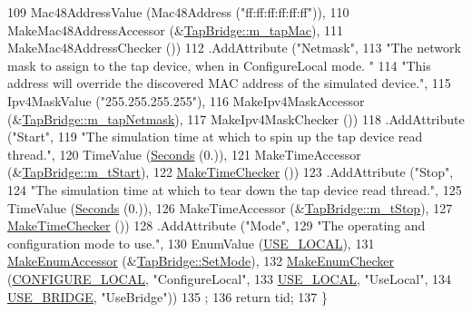 \begin{DoxyCode}
109                    Mac48AddressValue (Mac48Address (\textcolor{stringliteral}{"ff:ff:ff:ff:ff:ff"})),
110                    MakeMac48AddressAccessor (&\hyperlink{classns3_1_1TapBridge_afdaa87d8c5a5e249ee8d94f75183e91f}{TapBridge::m\_tapMac}),
111                    MakeMac48AddressChecker ())
112     .AddAttribute (\textcolor{stringliteral}{"Netmask"}, 
113                    \textcolor{stringliteral}{"The network mask to assign to the tap device, when in ConfigureLocal mode.  "}
114                    \textcolor{stringliteral}{"This address will override the discovered MAC address of the simulated device."},
115                    Ipv4MaskValue (\textcolor{stringliteral}{"255.255.255.255"}),
116                    MakeIpv4MaskAccessor (&\hyperlink{classns3_1_1TapBridge_a9374f832e2a96385651d27a5fbc7ba57}{TapBridge::m\_tapNetmask}),
117                    MakeIpv4MaskChecker ())
118     .AddAttribute (\textcolor{stringliteral}{"Start"}, 
119                    \textcolor{stringliteral}{"The simulation time at which to spin up the tap device read thread."},
120                    TimeValue (\hyperlink{group__timecivil_ga33c34b816f8ff6628e33d5c8e9713b9e}{Seconds} (0.)),
121                    MakeTimeAccessor (&\hyperlink{classns3_1_1TapBridge_ad6cde3114d24223d3edf0270ce4af231}{TapBridge::m\_tStart}),
122                    \hyperlink{group__time_ga7032965bd4afa578691d88c09e4481c1}{MakeTimeChecker} ())
123     .AddAttribute (\textcolor{stringliteral}{"Stop"}, 
124                    \textcolor{stringliteral}{"The simulation time at which to tear down the tap device read thread."},
125                    TimeValue (\hyperlink{group__timecivil_ga33c34b816f8ff6628e33d5c8e9713b9e}{Seconds} (0.)),
126                    MakeTimeAccessor (&\hyperlink{classns3_1_1TapBridge_ae91102625b83c3b447f48d1798041ab8}{TapBridge::m\_tStop}),
127                    \hyperlink{group__time_ga7032965bd4afa578691d88c09e4481c1}{MakeTimeChecker} ())
128     .AddAttribute (\textcolor{stringliteral}{"Mode"}, 
129                    \textcolor{stringliteral}{"The operating and configuration mode to use."},
130                    EnumValue (\hyperlink{classns3_1_1TapBridge_acac8d3ebe259ddfa9cd369515f04618daa73ff9ba9e1659aeda35d7181b601c75}{USE\_LOCAL}),
131                    \hyperlink{namespacens3_af5050739867ce63896dec011e332c8ec}{MakeEnumAccessor} (&\hyperlink{classns3_1_1TapBridge_a435d654af7e7970c365d14b4a5dc3044}{TapBridge::SetMode}),
132                    \hyperlink{namespacens3_a48832781a2b521d3d0091e05ece30615}{MakeEnumChecker} (\hyperlink{classns3_1_1TapBridge_acac8d3ebe259ddfa9cd369515f04618daf2d0f6c8152d38e9400b2d9fd35f02a3}{CONFIGURE\_LOCAL}, \textcolor{stringliteral}{"ConfigureLocal"},
133                                     \hyperlink{classns3_1_1TapBridge_acac8d3ebe259ddfa9cd369515f04618daa73ff9ba9e1659aeda35d7181b601c75}{USE\_LOCAL}, \textcolor{stringliteral}{"UseLocal"},
134                                     \hyperlink{classns3_1_1TapBridge_acac8d3ebe259ddfa9cd369515f04618da33daa0eda93d6ec20fc491d7c440fc8d}{USE\_BRIDGE}, \textcolor{stringliteral}{"UseBridge"}))
135   ;
136   \textcolor{keywordflow}{return} tid;
137 \}
\end{DoxyCode}


